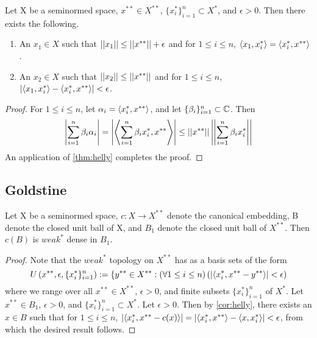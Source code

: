 \begin{cor}
    \label{cor:helly}
    Let X be a seminormed space, $x^{**} \in X^{**}$, $\{x_i^*\}_{i=1}^n \subset X^*$, and $\epsilon > 0$. Then there exists the following.
    \begin{enumerate}
        \item An $x_1 \in X$ such that $\left|\left| x_1 \right|\right| \leq \left|\left| x^{**} \right|\right|+\epsilon$ and for $1 \leq i \leq n$, $\left\langle x_1,x_i^* \right\rangle = \left\langle x_i^*,x^{**} \right\rangle$.  
        \item An $x_2 \in X$ such that $\left|\left| x_2 \right|\right| \leq \left|\left| x^{**} \right|\right|$ and for $1 \leq i \leq n$, $\left| \left\langle x_1,x_i^* \right\rangle-\left\langle x_i^*,x^{**} \right\rangle \right| < \epsilon$. 
    \end{enumerate} 
    \begin{proof} For $1 \leq i \leq n$, let $\alpha_i=\left\langle x_i^*,x^{**} \right\rangle$, and let $\{\beta_i\}_{i=1}^n \subset \mathbb{C}$. Then 
        \begin{equation}
            \left| \sum_{i=1}^n \beta_i \alpha_i \right| = \left|  \left\langle \sum_{i=1}^n \beta_i x_i^*,x^{**} \right\rangle \right| \leq \left|\left| x^{**} \right|\right| \left|\left| \sum_{i=1}^n \beta_i x_i^* \right|\right|
        \end{equation}
        An application of \ref{thm:helly} completes the proof. 
    \end{proof} 
\end{cor} 
\subsection{Goldstine} 
\begin{thm}[Goldstine]
    \label{thm:goldstine}
    Let X be a seminormed space, $c:X \to X^{**}$ denote the canonical embedding, B denote the closed unit ball of X, and $B_1$ denote the closed unit ball of $X^{**}$. Then $c(B)$ is $weak^*$ dense in $B_1$.   
    \begin{proof}
        Note that the $weak^*$ topology on $X^{**}$ has as a basis sets of the form
        \begin{equation}
            U\left( x^{**},\epsilon,\{x_i^*\}_{i=1}^n\right):=\{ y^{**} \in X^{**} : \left( \forall 1 \leq i \leq n\right)\left(  \left| \left\langle x_i^*,x^{**}-y^{**} \right\rangle \right| < \epsilon \right)
        \end{equation}
        where we range over all $x^{**} \in X^{**}$, $\epsilon > 0$, and finite subsets $\{x_i^*\}_{i=1}^n$ of $X^*$. 
        Let $x^{**} \in B_1$, $\epsilon > 0$, and $\{x_i^*\}_{i=1}^n \subset X^*$. 
        Let $\epsilon > 0$. Then by \ref{cor:helly}, there exists an $x \in B$ such that for $1 \leq i \leq n$, $\left| \left\langle x_i^*,x^{**}-c(x) \right\rangle \right|= \left| \left\langle x_i^*,x^{**} \right\rangle-\left\langle x,x_i^* \right\rangle \right| < \epsilon$, from which the desired result follows.
    \end{proof}
\end{thm} 
